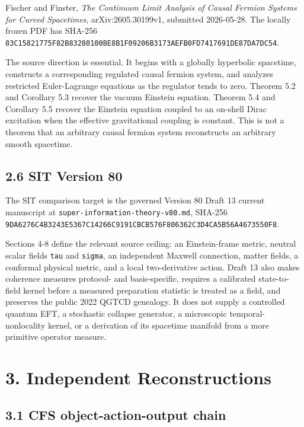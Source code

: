 \documentclass[
  american,
  11pt,
  letterpaper,
]{article}
\begin{document}
Fischer and Finster, \emph{The Continuum Limit Analysis of Causal Fermion Systems for Curved Spacetimes}, arXiv:2605.30199v1, submitted 2026-05-28. The locally frozen PDF has SHA-256 \nolinkurl{83C15821775F82B83280100BE8B1F09206B3173AEFB0FD7417691DE87DA7DC54}.

The source direction is essential. It begins with a globally hyperbolic spacetime, constructs a corresponding regulated causal fermion system, and analyzes restricted Euler-Lagrange equations as the regulator tends to zero. Theorem 5.2 and Corollary 5.3 recover the vacuum Einstein equation. Theorem 5.4 and Corollary 5.5 recover the Einstein equation coupled to an on-shell Dirac excitation when the effective gravitational coupling is constant. This is not a theorem that an arbitrary causal fermion system reconstructs an arbitrary smooth spacetime.

\subsection{2.6 SIT Version 80}\label{sit-version-80}

The SIT comparison target is the governed Version 80 Draft 13 current manuscript at \nolinkurl{super-information-theory-v80.md}, SHA-256 \nolinkurl{9DA6276C4B3243E5367C14266C9191CBCB576F806362C3D4CA5B56A4673550F8}.

Sections 4-8 define the relevant source ceiling: an Einstein-frame metric, neutral scalar fields \texttt{tau} and \texttt{sigma}, an independent Maxwell connection, matter fields, a conformal physical metric, and a local two-derivative action. Draft 13 also makes coherence measures protocol- and basis-specific, requires a calibrated state-to-field kernel before a measured preparation statistic is treated as a field, and preserves the public 2022 QGTCD genealogy. It does not supply a controlled quantum EFT, a stochastic collapse generator, a microscopic temporal-nonlocality kernel, or a derivation of its spacetime manifold from a more primitive operator measure.

\section{3. Independent Reconstructions}\label{independent-reconstructions}

\subsection{3.1 CFS object-action-output chain}\label{cfs-object-action-output-chain}
\end{document}
